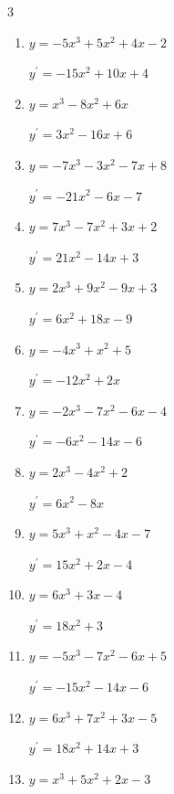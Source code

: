 \begin{multicols}{3}
\begin{enumerate}
\columnbreak %

\resetques

  \item $y=-5x^{3}+5x^{2}+4x-2$

        $\displaystyle y^{\prime}=-15x^{2}+10x+4$

  \item $y=x^{3}-8x^{2}+6x$

        $\displaystyle y^{\prime}=3x^{2}-16x+6$

  \item $y=-7x^{3}-3x^{2}-7x+8$

        $\displaystyle y^{\prime}=-21x^{2}-6x-7$

  \item $y=7x^{3}-7x^{2}+3x+2$

        $\displaystyle y^{\prime}=21x^{2}-14x+3$

  \item $y=2x^{3}+9x^{2}-9x+3$

        $\displaystyle y^{\prime}=6x^{2}+18x-9$

  \item $y=-4x^{3}+x^{2}+5$

        $\displaystyle y^{\prime}=-12x^{2}+2x$

  \item $y=-2x^{3}-7x^{2}-6x-4$

        $\displaystyle y^{\prime}=-6x^{2}-14x-6$

  \item $y=2x^{3}-4x^{2}+2$

        $\displaystyle y^{\prime}=6x^{2}-8x$

  \item $y=5x^{3}+x^{2}-4x-7$

        $\displaystyle y^{\prime}=15x^{2}+2x-4$

  \item $y=6x^{3}+3x-4$

        $\displaystyle y^{\prime}=18x^{2}+3$

  \item $y=-5x^{3}-7x^{2}-6x+5$

        $\displaystyle y^{\prime}=-15x^{2}-14x-6$

  \item $y=6x^{3}+7x^{2}+3x-5$

        $\displaystyle y^{\prime}=18x^{2}+14x+3$

  \item $y=x^{3}+5x^{2}+2x-3$


\end{enumerate}
\end{multicols}
